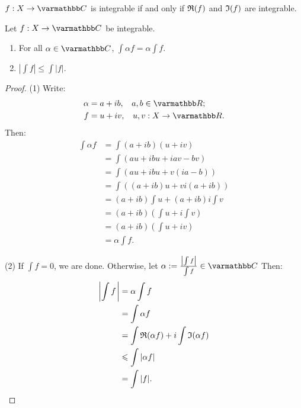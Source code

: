 \begin{proposition}
    $f:X \rightarrow \bfC$ is integrable if and only if $\fR(f)$ and $\fI(f)$ are integrable.
\end{proposition}
\begin{proposition}
    Let $f:X \rightarrow \bfC$ be integrable.
    \begin{enumerate}[label = (\arabic*),itemsep=1pt,topsep=3pt]
        \item For all $\alpha \in \bfC$, $\int \alpha f = \alpha \int f$.
        \item $\left| \int f \right| \leq \int |f|$.
    \end{enumerate}
\end{proposition}
    \begin{proof}
        (1) Write:
            \begin{equation*}
            \begin{split}
                \alpha &= a+ib,\h9 a,b \in \bfR;\\
                f &= u+iv,\h9 u,v:X \rightarrow \bfR.
            \end{split}
            \end{equation*}
        Then:
            \begin{equation*}
            \begin{split}
                \int \alpha f 
                & = \int (a+ib)(u+iv) \\
                & = \int (au + ibu + iav -bv) \\
                & = \int (au + ibu + v(ia-b)) \\
                & = \int ((a+ib)u + vi(a+ib)) \\
                & = (a+ib)\int u + (a+ib)i\int v \\
                & = (a+ib) \left( \int u + i \int v \right) \\
                & = (a+ib) \left( \int u + i  v \right) \\
                & = \alpha \int f.
            \end{split}
            \end{equation*}

        (2) If $\int f = 0$, we are done. Otherwise, let $\alpha := \frac{\left| \int f \right|}{\int f} \in \bfC$ Then:
            \begin{equation*}
            \begin{split}
                \left| \int f \h1\right|
                & = \alpha \int f \\
                & = \int \alpha f \\
                & = \int \fR(\alpha f) + i \int \fI(\alpha f) \\
                & \leq \int |\alpha f| \\
                & = \int |f|.
            \end{split}
            \end{equation*}
    \end{proof}

